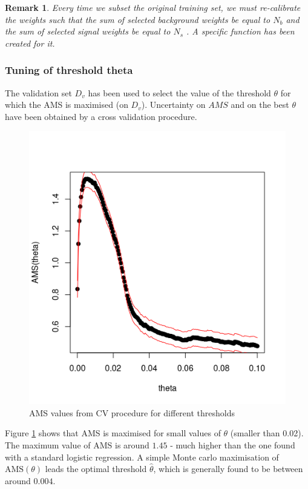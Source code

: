 \documentclass[]{article}
\newtheorem{remark}[theorem]{Remark}
\begin{document}
\begin{remark}
Every time we subset the original training set, we must re-calibrate the weights such that the sum of selected background weights be equal to $N_b$ and the sum of selected signal weights be equal to $N_s$ . A specific function has been created for it.
\end{remark} 



\subsubsection{Tuning of threshold theta}
The validation set $D_v$ has been used to select the value of the threshold $\theta$ for which the AMS is maximised (on $D_v$). Uncertainty on $AMS$ and on the best $\theta$ have been obtained by a cross validation procedure.


\begin{figure}[H]
\centering
\label{fig: train_tuned_theta}
\includegraphics[scale=0.7]{../Pictures/traintunedtheta.png}
\caption{AMS values from CV procedure for different thresholds}
\end{figure}

Figure \ref{fig: train_tuned_theta} shows that AMS is maximised for small values of $\theta$ (smaller than 0.02). The maximum value of AMS is around $1.45$ - much higher than the one found with a standard logistic regression. A simple Monte carlo maximisation of $\text{AMS}(\theta)$ leads the optimal threshold $\hat{\theta}$, which is generally found to be between around $0.004$. \\
\end{document}
